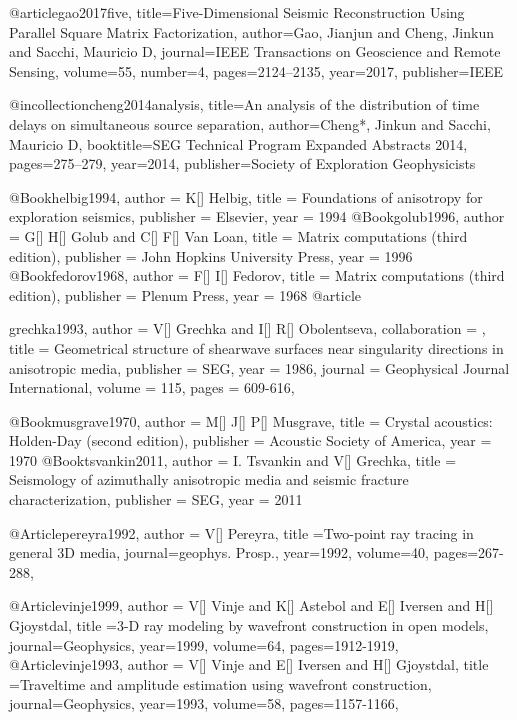 {@article{gao2017five,
  title={Five-Dimensional Seismic Reconstruction Using Parallel Square Matrix Factorization},
  author={Gao, Jianjun and Cheng, Jinkun and Sacchi, Mauricio D},
  journal={IEEE Transactions on Geoscience and Remote Sensing},
  volume={55},
  number={4},
  pages={2124--2135},
  year={2017},
  publisher={IEEE}
}

@incollection{cheng2014analysis,
  title={An analysis of the distribution of time delays on simultaneous source separation},
  author={Cheng*, Jinkun and Sacchi, Mauricio D},
  booktitle={SEG Technical Program Expanded Abstracts 2014},
  pages={275--279},
  year={2014},
  publisher={Society of Exploration Geophysicists}
}

@Book{helbig1994,
  author =	 {K[] Helbig},
  title =	 {Foundations of anisotropy for exploration seismics},
  publisher =	 {Elsevier},
  year =	 1994
}
@Book{golub1996,
  author =	 {G[] H[] Golub and C[] F[] Van Loan},
  title =	 {Matrix computations (third edition)},
  publisher =	 {John Hopkins University Press},
  year =	 1996
}
@Book{fedorov1968,
  author =	 {F[] I[] Fedorov},
  title =	 {Matrix computations (third edition)},
  publisher =	 {Plenum Press},
  year =	 1968
}
@article{grechka1993,
author = {V[] Grechka and I[] R[] Obolentseva},
collaboration = {},
title = {Geometrical structure of shearwave
surfaces near singularity directions in anisotropic media},
publisher = {SEG},
year = {1986},
journal = {Geophysical Journal International},
volume = {115},
pages = {609-616},

}

@Book{musgrave1970,
  author =	 {M[] J[] P[] Musgrave},
  title =	 {Crystal acoustics: Holden-Day (second edition)},
  publisher =	 {Acoustic Society of America},
  year =	 1970
}
@Book{tsvankin2011,
  author =	 {I. Tsvankin and V[] Grechka},
  title =	 {Seismology of azimuthally anisotropic media and seismic fracture characterization},
  publisher =	 {SEG},
  year =	 2011
}

@Article{pereyra1992,
  author = {V[] Pereyra},
  title ={Two-point ray tracing in general 3{D} media},
  journal={geophys. Prosp.},
  year=1992,
  volume=40,
  pages={267-288},
}


@Article{vinje1999,
  author = {V[] Vinje and K[] Astebol and E[] Iversen and H[] Gjoystdal},
  title ={3-D ray modeling by wavefront construction in open models},
  journal={Geophysics},
  year=1999,
  volume=64,
  pages={1912-1919},
}
@Article{vinje1993,
  author = {V[] Vinje and E[] Iversen and H[] Gjoystdal},
  title ={Traveltime and amplitude estimation using wavefront construction},
  journal={Geophysics},
  year=1993,
  volume=58,
  pages={1157-1166},
}


}
